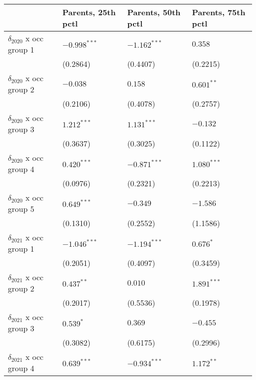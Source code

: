 \begin{tabular}{llll}
\toprule
{} & Parents, 25th pctl & Parents, 50th pctl & Parents, 75th pctl \\
\midrule
$\delta_{2020}$ x occ group 1          &     $-0.998^{***}$ &     $-1.162^{***}$ &            $0.358$ \\
                                       &           (0.2864) &           (0.4407) &           (0.2215) \\
$\delta_{2020}$ x occ group 2          &           $-0.038$ &            $0.158$ &       $0.601^{**}$ \\
                                       &           (0.2106) &           (0.4078) &           (0.2757) \\
$\delta_{2020}$ x occ group 3          &      $1.212^{***}$ &      $1.131^{***}$ &           $-0.132$ \\
                                       &           (0.3637) &           (0.3025) &           (0.1122) \\
$\delta_{2020}$ x occ group 4          &      $0.420^{***}$ &     $-0.871^{***}$ &      $1.080^{***}$ \\
                                       &           (0.0976) &           (0.2321) &           (0.2213) \\
$\delta_{2020}$ x occ group 5          &      $0.649^{***}$ &           $-0.349$ &           $-1.586$ \\
                                       &           (0.1310) &           (0.2552) &           (1.1586) \\
$\delta_{2021}$ x occ group 1          &     $-1.046^{***}$ &     $-1.194^{***}$ &          $0.676^*$ \\
                                       &           (0.2051) &           (0.4097) &           (0.3459) \\
$\delta_{2021}$ x occ group 2          &       $0.437^{**}$ &            $0.010$ &      $1.891^{***}$ \\
                                       &           (0.2017) &           (0.5536) &           (0.1978) \\
$\delta_{2021}$ x occ group 3          &          $0.539^*$ &            $0.369$ &           $-0.455$ \\
                                       &           (0.3082) &           (0.6175) &           (0.2996) \\
$\delta_{2021}$ x occ group 4          &      $0.639^{***}$ &     $-0.934^{***}$ &       $1.172^{**}$ \\

\end{tabular}
